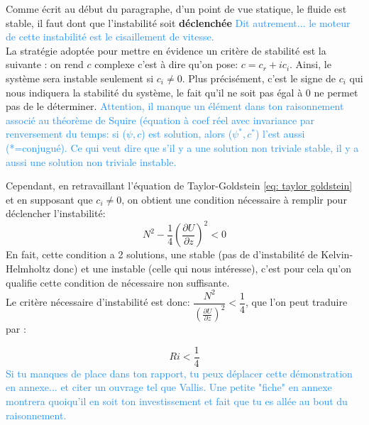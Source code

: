 \documentclass{rapportECC}
\newcommand{\FAadd}[1]{\textcolor{DodgerBlue}{{#1}}}                     %
\begin{document}
Comme écrit au début du paragraphe, d'un point de vue statique, le fluide est stable, il faut dont que l'instabilité soit \textbf{déclenchée} \FAadd{Dit autrement... le moteur de cette instabilité est le cisaillement de vitesse.} \\

La stratégie adoptée pour mettre en évidence un critère de stabilité est la suivante : on rend $c$ complexe c'est à dire qu'on pose: $c = c_r + ic_i $. Ainsi, le système sera instable seulement si $c_i \neq 0$. Plus précisément, c'est le signe de $c_i$ qui nous indiquera la stabilité du système, le fait qu'il ne soit pas égal à 0 ne permet pas de le déterminer. \FAadd{Attention, il manque un élément dans ton raisonnement associé au théorème de Squire (équation à coef réel avec invariance par renversement du temps: si ($\psi, c$) est solution, alors ($\psi^*, c^*$) l'est aussi (*=conjugué). Ce qui veut dire que s'il y a une solution non triviale stable, il y a aussi une solution non triviale instable.}

Cependant, en retravaillant l'équation de Taylor-Goldstein \eqref{eq: taylor goldstein} et en supposant que $c_i \neq 0$, on obtient une condition nécessaire à remplir pour déclencher l'instabilité:
\begin{equation}
    N^{2} - \frac{1}{4}(\frac{\partial U}{\partial z})^{2}  < 0
\end{equation}
En fait, cette condition a 2 solutions, une stable (pas de d'instabilité de Kelvin-Helmholtz donc) et une instable (celle qui nous intéresse), c'est pour cela qu'on qualifie cette condition de nécessaire non suffisante.\\
Le critère nécessaire d'instabilité est donc: $\dfrac{N^2}{(\frac{\partial U}{\partial z})^2} < \dfrac{1}{4}$, que l'on peut traduire par :

\begin{equation}
    Ri < \frac{1}{4}
\end{equation}
\FAadd{Si tu manques de place dans ton rapport, tu peux déplacer cette démonstration en annexe... et citer un ouvrage tel que Vallis. Une petite "fiche" en annexe montrera quoiqu'il en soit ton investissement et fait que tu es allée au bout du raisonnement.}
\end{document}

